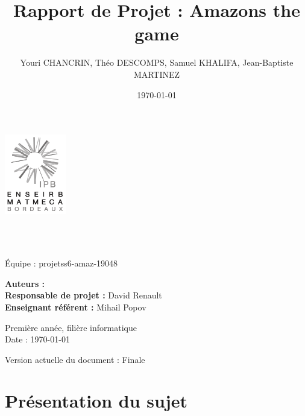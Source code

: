 \documentclass{article}
\title{Rapport de Projet : Amazons the game}
\author{Youri CHANCRIN, Théo DESCOMPS, Samuel KHALIFA, Jean-Baptiste MARTINEZ}
\date{\today}
\makeatletter
\let\mytitle\@title
\let\myauthor\@author
\makeatother
\begin{document}
\begin{flushleft}

\thispagestyle{empty}
\includegraphics[width=0.2\textwidth]{enseirb-matmeca}
\graphicspath{{./img/}}


\hrulefill \\[2em]
\begin{center}
\textbf{\Huge \mytitle}\\[0.8em]
{\large Équipe : projetss6-amaz-19048}
\\[0.8em]
\end{center}
\hrulefill


{\large \textbf{Auteurs :} \myauthor}\\
{\large \textbf{Responsable de projet :} David Renault}\\
{\large \textbf{Enseignant référent :} Mihail Popov}


\begin{center}
  Première année, filière informatique\\
  Date : \today
\end{center}


\hfill Version actuelle du document : Finale

\end{flushleft}

\newpage

\tableofcontents

\newpage

\section{Présentation du sujet}

\end{document}
